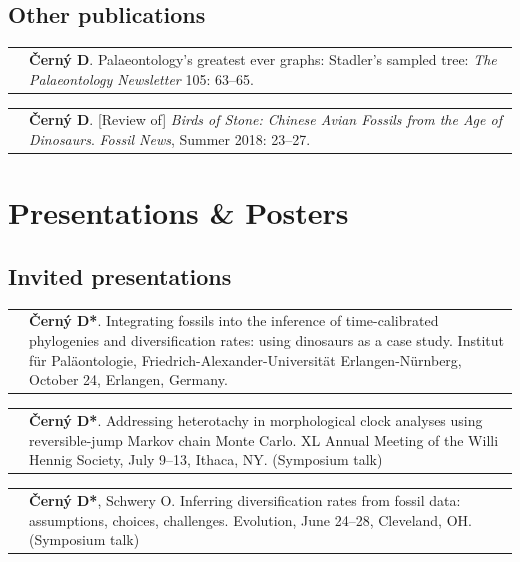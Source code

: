 \documentclass[10pt]{article}
\begin{document}
\subsection*{Other publications}

\begin{tabularx}{\textwidth}{>{\raggedleft\arraybackslash}p{2.2cm} X}
2020 & \textbf{\v{C}ern\'{y} D}. Palaeontology's greatest ever graphs:
Stadler's sampled tree: \textit{The Palaeontology Newsletter} 105: 63--65.
\end{tabularx}
\begin{tabularx}{\textwidth}{>{\raggedleft\arraybackslash}p{2.2cm} X}
2018 & \textbf{\v{C}ern\'{y} D}. [Review of] \textit{Birds of Stone: Chinese Avian Fossils from the Age of Dinosaurs}. \textit{Fossil News}, Summer 2018: 23--27.
\end{tabularx}

\section*{Presentations \& Posters}

\subsection*{Invited presentations}

\begin{tabularx}{\textwidth}{>{\raggedleft\arraybackslash}p{2.2cm} X}
2023 & \textbf{\v{C}ern\'{y} D*}. Integrating fossils into the inference of time-calibrated phylogenies and diversification rates: using dinosaurs as a case study. Institut f\"{u}r Pal\"{a}ontologie, Friedrich-Alexander-Universit\"{a}t Erlangen-N\"{u}rnberg, October 24, Erlangen, Germany.
\end{tabularx}
\begin{tabularx}{\textwidth}{>{\raggedleft\arraybackslash}p{2.2cm} X}
2023 & \textbf{\v{C}ern\'{y} D*}. Addressing heterotachy in morphological clock analyses using reversible-jump Markov chain Monte Carlo. XL Annual Meeting of the Willi Hennig Society, July 9--13, Ithaca, NY. (Symposium talk)
\end{tabularx}
\begin{tabularx}{\textwidth}{>{\raggedleft\arraybackslash}p{2.2cm} X}
2022 & \textbf{\v{C}ern\'{y} D*}, Schwery O. Inferring diversification rates from fossil data: assumptions, choices, challenges. Evolution, June 24--28, Cleveland, OH. (Symposium talk)
\end{tabularx}
\end{document}
